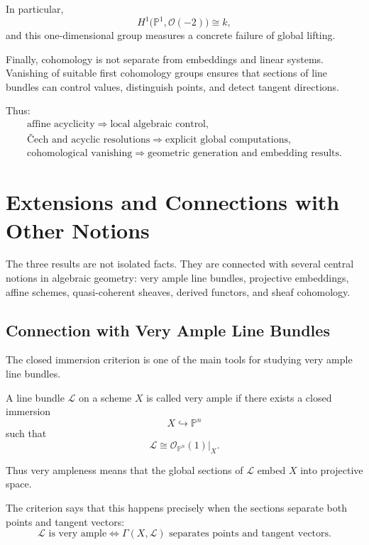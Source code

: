 \documentclass[12pt,a4paper]{article}
\theoremstyle{notespace}
\begin{document}
In particular,
\[
H^{1}\bigl(\mathbb{P}^{1},\mathcal{O}(-2)\bigr)
\cong
k,
\]
and this one-dimensional group measures a concrete failure of global
lifting.

Finally, cohomology is not separate from embeddings and linear systems.
Vanishing of suitable first cohomology groups ensures that sections of line
bundles can control values, distinguish points, and detect tangent
directions.

Thus:
\[
\boxed{
	\begin{array}{c}
		\text{affine acyclicity}
		\Longrightarrow
		\text{local algebraic control},
		\\[5pt]
		\text{Čech and acyclic resolutions}
		\Longrightarrow
		\text{explicit global computations},
		\\[5pt]
		\text{cohomological vanishing}
		\Longrightarrow
		\text{geometric generation and embedding results}.
	\end{array}
}
\]


\section{Extensions and Connections with Other Notions}

The three results are not isolated facts. They are connected with several central notions in algebraic geometry: very ample line bundles, projective embeddings, affine schemes, quasi-coherent sheaves, derived functors, and sheaf cohomology.

\subsection{Connection with Very Ample Line Bundles}

The closed immersion criterion is one of the main tools for studying very ample line bundles.

A line bundle \(\mathcal L\) on a scheme \(X\) is called very ample if there exists a closed immersion
\[
X\hookrightarrow \mathbb P^n
\]
such that
\[
\mathcal L\cong \mathcal O_{\mathbb P^n}(1)|_X.
\]

Thus very ampleness means that the global sections of \(\mathcal L\) embed \(X\) into projective space.

The criterion says that this happens precisely when the sections separate both points and tangent vectors:
\[
\boxed{
	\mathcal L \text{ is very ample}
	\iff
	\Gamma(X,\mathcal L)
	\text{ separates points and tangent vectors.}
}
\]
\end{document}
